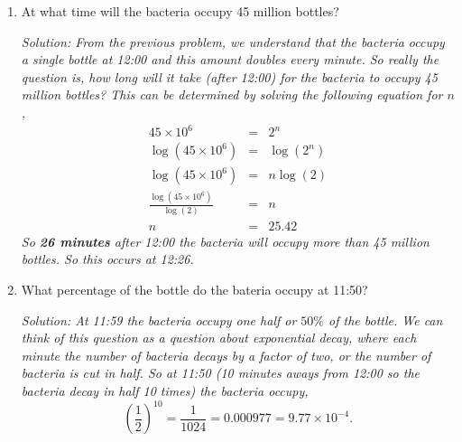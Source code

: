 \documentclass[12pt]{article}
\begin{document}
\begin{enumerate}
\item At what time will the bacteria occupy 45 million bottles?

{\it Solution:
From the previous problem, we understand that the bacteria occupy a single bottle at 12:00 and this amount doubles every minute.  So really the question is, how long will it take (after 12:00) for the bacteria to occupy 45 million bottles?  This can be determined by solving the following equation for $n$, \begin{eqnarray*}
	45\times 10^6 &=& 2^n \\
	\log(45\times 10^6) &=& \log(2^n) \\
	\log(45\times 10^6) &=& n\log(2) \\
	\frac{\log(45\times 10^6)}{\log(2)} &=& n \\
	n &=& 25.42
\end{eqnarray*}
So {\bf 26 minutes} after 12:00 the bacteria will occupy more than 45 million bottles.  So this occurs at 12:26.


}

\item What percentage of the bottle do the bateria occupy at 11:50?

{\it Solution:
At 11:59 the bacteria occupy one half or $50\%$ of the bottle.  We can think of this question as a question about exponential decay, where each minute the number of bacteria decays by a factor of two, or the number of bacteria is cut in half.  So at 11:50 (10 minutes aways from 12:00 so the bacteria decay in half 10 times) the bacteria occupy, $$(\frac{1}{2})^{10} = \frac{1}{1024} = 0.000977 = 9.77\times 10^{-4}.$$

}

\end{enumerate}





\end{document}
